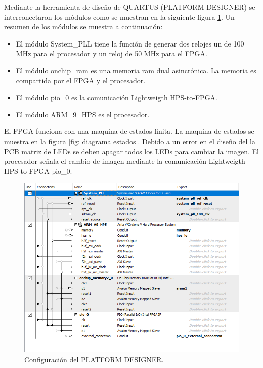 Mediante la herramienta de diseño de QUARTUS (PLATFORM DESIGNER) se interconectaron los módulos como se muestran en la siguiente figura \ref{fig: platform}. Un resumen de los módulos se muestra a continuación:
\begin{itemize}
\item El módulo System\_PLL tiene la función de generar dos relojes un de 100 MHz para el procesador y un reloj de 50 MHz para el FPGA.
\item El módulo onchip\_ram es una memoria ram dual asincrónica. La memoria es compartida por el FPGA y el procesador. 
\item El módulo pio\_0 es la comunicación Lightweigth HPS-to-FPGA. 
\item El módulo ARM\_9\_HPS es el procesador. 
\end{itemize}

El FPGA funciona con una maquina de estados finita. La maquina de estados se muestra en la figura \ref{fig: diagrama estados}. Debido a un error en el diseño del la PCB matriz de LEDs se deben apagar todos los LEDs para cambiar la imagen. El procesador señala el cambio de imagen mediante la comunicación Lightweigth HPS-to-FPGA pio\_0.

 



\begin{figure}[htpb]
	\centering
	\includegraphics[scale=0.8]{Figures/platformdesigner.png} 
	\caption{Configuración del PLATFORM DESIGNER.}
	\label{fig: platform}
\end{figure}



